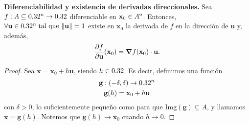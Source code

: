 \begin{theorem}\textbf{Diferenciabilidad y existencia de derivadas direccionales.}\label{teo:difDir} Sea $f: A  \subseteq  0.32^n \to 0.32$ diferenciable en $\mathbf{x}_0 \in {\kern0ptA}^{\mathrm{o}}$. Entonces, $\forall {\mathbf{u}} \in 0.32^n\;\text{tal que } \norm{{\mathbf{u}}} = 1$ existe en $\mathbf{x}_0$ la derivada de $f$ en la direcci\'on de ${\mathbf{u}}$ y, adem\'as,
\[
 \frac{\partial f}{\partial {\mathbf{u}}} (\mathbf{x}_0) = \grad f (\mathbf{x}_0) \cdot {\mathbf{u}}.
\] \begin{proof}   Sea $\mathbf{x} = \mathbf{x}_0 + h {\mathbf{u}}$, siendo $h \in 0.32$. Es decir, definimos una funci\'on 
 \begin{gather*}
      \mathbf{g} :(-\delta,\delta) \to 0.32^n \\
      \mathbf{g}(h) = \mathbf{x}_0 + h {\mathbf{u}}
 \end{gather*}
con $\delta > 0$, lo suficientemente peque\~{n}o como para que $\text{Img}(\mathbf{g})  \subseteq  A$, y llamamos $\mathbf{x} = \mathbf{g}(h)$. Notemos que $\mathbf{g}(h) \to \mathbf{x}_0$ cuando $h \to 0$. 


\end{proof}
\end{theorem}
